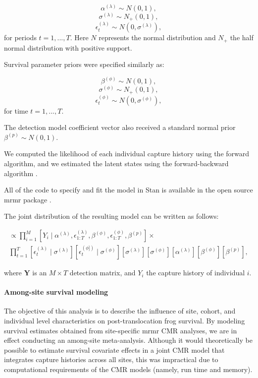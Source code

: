 \documentclass[
  letterpaper,
  DIV=11,
  numbers=noendperiod]{scrartcl}
\let\oldparagraph\paragraph
\renewcommand{\paragraph}[1]{\oldparagraph{#1}\mbox{}}
\begin{document}
\[\alpha^{(\lambda)} \sim N(0,1),\]
\[\sigma^{(\lambda)} \sim N_+(0,1),\]
\[\epsilon^{(\lambda)}_t \sim N(0, \sigma^{(\lambda)}),\] for periods
\(t=1, ..., T\). Here \(N\) represents the normal distribution and
\(N_+\) the half normal distribution with positive support.

Survival parameter priors were specified similarly as:

\[\beta^{(\phi)} \sim N(0, 1),\] \[\sigma^{(\phi)} \sim N_+(0, 1),\]
\[\epsilon^{(\phi)}_t \sim N(0, \sigma^{(\phi)}),\] for time
\(t=1, ..., T\).

The detection model coefficient vector also received a standard normal
prior \(\beta^{(p)} \sim N(0, 1)\).

We computed the likelihood of each individual capture history using the
forward algorithm, and we estimated the latent states using the
forward-backward algorithm \citep{zucchini2009, joseph2018}.

All of the code to specify and fit the model in Stan is available in the
open source mrmr package \citep{joseph2019}.

The joint distribution of the resulting model can be written as follows:

\begin{multline*}
[\alpha^{(\lambda)}, \sigma^{(\lambda)}, \epsilon^{(\lambda)}_{1:T}, \beta^{(\phi)}, \sigma^{(\phi)}, \epsilon^{(\phi)}_{1:T}, \beta^{(p)} \mid \pmb Y] \propto \prod_{i=1}^M [Y_i \mid \alpha^{(\lambda)}, \epsilon^{(\lambda)}_{1:T}, \beta^{(\phi)}, \epsilon^{(\phi)}_{1:T}, \beta^{(p)}] \times \\
\prod_{t=1}^T [\epsilon_t^{(\lambda)} \mid \sigma^{(\lambda)}] [\epsilon_t^{(\phi])} \mid \sigma^{(\phi)}] [\sigma^{(\lambda)}] [\sigma^{(\phi)}] [\alpha^{(\lambda)}] [\beta^{(\phi)}] [\beta^{(p)}],
\end{multline*}

where \(\pmb Y\) is an \(M \times T\) detection matrix, and \(Y_i\) the
capture history of individual \(i\).

\hypertarget{among-site-survival-modeling}{%
\paragraph{Among-site survival
modeling}\label{among-site-survival-modeling}}

The objective of this analysis is to describe the influence of site,
cohort, and individual level characteristics on post-translocation frog
survival. By modeling survival estimates obtained from site-specific
mrmr CMR analyses, we are in effect conducting an among-site
meta-analysis. Although it would theoretically be possible to estimate
survival covariate effects in a joint CMR model that integrates capture
histories across all sites, this was impractical due to computational
requirements of the CMR models (namely, run time and memory).
\end{document}
